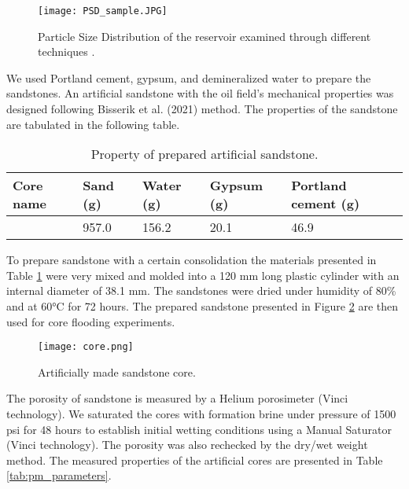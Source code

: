 \documentclass{article}
\begin{document}
{\begin{figure}[H]
\begin{centering}
\texttt{[image: PSD\_sample.JPG]}
\par\end{centering}
\caption{Particle Size Distribution of the reservoir examined through different techniques \citep{rakhimzhanova2019numerical}.\label{fig:PSD}}
\end{figure}

We used Portland cement, gypsum, and demineralized water to prepare the sandstones. An artificial sandstone with the oil field's mechanical properties was designed following Bisserik et al. (2021) method. The properties of the sandstone are tabulated in the following table. 

\begin{table}[H]
\fontsize{10}{12}\selectfont \caption{Property of prepared artificial sandstone.}
\begin{centering}
    \begin{tabular}{ p{3cm} p{2cm} p{2cm}  p{2cm} p{3cm}}
\toprule 
Core name & Sand (g) & Water (g) & Gypsum (g) & Portland cement (g) \\
\midrule
 & 957.0 & 156.2 & 20.1 & 46.9 \\
 \bottomrule
\end{tabular}
  \label{tab:core_parameters}
\par\end{centering}
\end{table}

To prepare sandstone with a certain consolidation the materials presented in Table \ref{tab:core_parameters} were very mixed and molded into a 120 mm long plastic cylinder with an internal diameter of 38.1 mm. The sandstones were dried under humidity of 80\% and at 60°C for 72 hours. The prepared sandstone presented in Figure \ref{fig:core} are then used for core flooding experiments.

\begin{figure}[H]
\begin{centering}
\texttt{[image: core.png]}
\par\end{centering}
\caption{Artificially made sandstone core.\label{fig:core}}
\end{figure}

The porosity of sandstone is measured by a Helium porosimeter (Vinci technology). We saturated the cores with formation brine under pressure of 1500 psi for 48 hours to establish initial wetting conditions using a Manual Saturator (Vinci technology). The porosity was also rechecked by the dry/wet weight method. The measured properties of the artificial cores are presented in Table \ref{tab:pm_parameters}.

}
\end{document}
